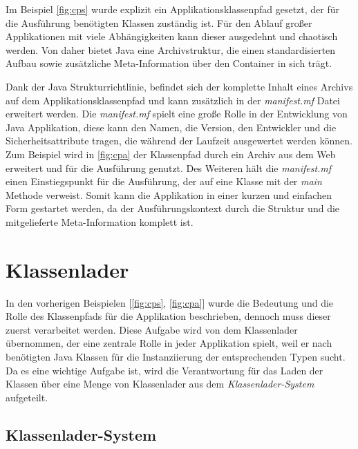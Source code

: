  Im Beispiel \ref{fig:cps} wurde explizit ein Applikationsklassenpfad gesetzt, der für die Ausführung benötigten Klassen zuständig ist. Für den Ablauf großer Applikationen mit viele Abhängigkeiten kann dieser ausgedehnt und chaotisch werden. Von daher bietet Java eine Archivstruktur, die einen standardisierten Aufbau sowie zusätzliche Meta-Information über den Container in sich trägt. 
  
  Dank der Java Strukturrichtlinie, befindet sich der komplette Inhalt eines Archivs auf dem Applikationsklassenpfad und kann zusätzlich in der \textit{manifest.mf} Datei erweitert werden. Die \textit{manifest.mf} spielt eine große Rolle in der Entwicklung von Java Applikation, diese kann den Namen, die Version, den Entwickler und die Sicherheitsattribute tragen, die während der Laufzeit ausgewertet werden können. Zum Beispiel wird in \ref{fig:cpa} der Klassenpfad durch ein Archiv aus dem Web erweitert und für die Ausführung genutzt. Des Weiteren hält die \textit{manifest.mf} einen Einstiegspunkt für die Ausführung, der auf eine Klasse mit der \textit{main} Methode verweist.\newline
  Somit kann die Applikation in einer kurzen und einfachen Form gestartet werden, da der Ausführungskontext durch die Struktur und die mitgelieferte Meta-Information komplett ist. \cite{classLoadingOracle}


\section{Klassenlader}\label{sec:cl}

  In den vorherigen Beispielen [\ref{fig:cps}, \ref{fig:cpa}] wurde die Bedeutung und die Rolle des Klassenpfads für die Applikation beschrieben, dennoch muss dieser zuerst verarbeitet werden. Diese Aufgabe wird von dem Klassenlader übernommen, der eine zentrale Rolle in jeder Applikation spielt, weil er nach benötigten Java Klassen für die Instanziierung der entsprechenden Typen sucht. Da es eine wichtige Aufgabe ist, wird die Verantwortung für das Laden der Klassen über eine Menge von Klassenlader aus dem \textit{Klassenlader-System} aufgeteilt. 


  \subsection{Klassenlader-System} \label{sec:cls}

